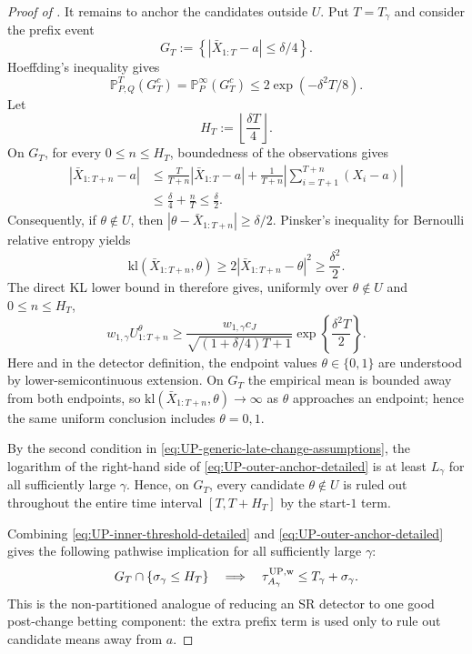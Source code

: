 \documentclass[12pt]{article}
\theoremstyle{spaced}
\theoremstyle{remark}
\newcommand{\bbP}{\mathbb P}
\newcommand{\kl}{\mathrm{kl}}
\begin{document}
\begin{proof}[Proof of ]
It remains to anchor the candidates outside $U$.  Put $T=T_\gamma$ and
consider the prefix event
\begin{equation}
\label{eq:UP-prefix-good-event}
 G_T:=\left\{|\bar X_{1:T}-a|\le\delta/4\right\}.
\end{equation}
Hoeffding's inequality gives
\begin{equation}
\label{eq:UP-prefix-good-probability}
 \bbP_{P,Q}^{T}(G_T^c)
 =\bbP_{P}^{\infty}(G_T^c)
 \le2\exp(-\delta^2T/8).
\end{equation}
Let
\begin{equation}
\label{eq:UP-anchor-horizon}
 H_T:=\left\lfloor\frac{\delta T}{4}\right\rfloor.
\end{equation}
On $G_T$, for every $0\le n\le H_T$, boundedness of the observations gives
\begin{align}
 |\bar X_{1:T+n}-a|
 &\le
 \frac{T}{T+n}|\bar X_{1:T}-a|
 +\frac1{T+n}\left|\sum_{i=T+1}^{T+n}(X_i-a)\right|
 \\
 &\le \frac{\delta}{4}+\frac nT
 \le\frac\delta2.
\label{eq:UP-cross-average-deterministic}
\end{align}
Consequently, if $\theta\notin U$, then
$|\theta-\bar X_{1:T+n}|\ge\delta/2$.  Pinsker's inequality for Bernoulli
relative entropy yields
\[
 \kl(\bar X_{1:T+n},\theta)
 \ge2|\bar X_{1:T+n}-\theta|^2
 \ge\frac{\delta^2}{2}.
\]
The direct KL lower bound in  therefore gives,
uniformly over $\theta\notin U$ and $0\le n\le H_T$,
\begin{equation}
\label{eq:UP-outer-anchor-detailed}
 w_{1,\gamma}U_{1:T+n}^{\theta}
 \ge
 \frac{w_{1,\gamma}c_J}
      {\sqrt{(1+\delta/4)T+1}}
 \exp\left\{\frac{\delta^2T}{2}\right\}.
\end{equation}
Here and in the detector definition, the endpoint values $\theta\in\{0,1\}$
are understood by lower-semicontinuous extension.  On $G_T$ the empirical
mean is bounded away from both endpoints, so
$\kl(\bar X_{1:T+n},\theta)\to\infty$ as $\theta$ approaches an
endpoint; hence the same uniform conclusion includes $\theta=0,1$.

By the second condition in
\eqref{eq:UP-generic-late-change-assumptions}, the logarithm of the
right-hand side of \eqref{eq:UP-outer-anchor-detailed} is at least
$L_\gamma$ for all sufficiently large $\gamma$.  Hence, on $G_T$, every
candidate $\theta\notin U$ is ruled out throughout the entire time interval
$[T,T+H_T]$ by the start-$1$ term.

Combining \eqref{eq:UP-inner-threshold-detailed} and
\eqref{eq:UP-outer-anchor-detailed} gives the following pathwise implication
for all sufficiently large $\gamma$:
\begin{equation}
\label{eq:UP-pathwise-delay-reduction}
 G_T\cap\{\sigma_\gamma\le H_T\}
 \quad\Longrightarrow\quad
 \tau_{A_\gamma}^{\rm UP,w}
 \le T_\gamma+\sigma_\gamma.
\end{equation}
This is the non-partitioned analogue of reducing an SR detector to one good
post-change betting component: the extra prefix term is used only to rule
out candidate means away from $a$.


\end{proof}
\end{document}
